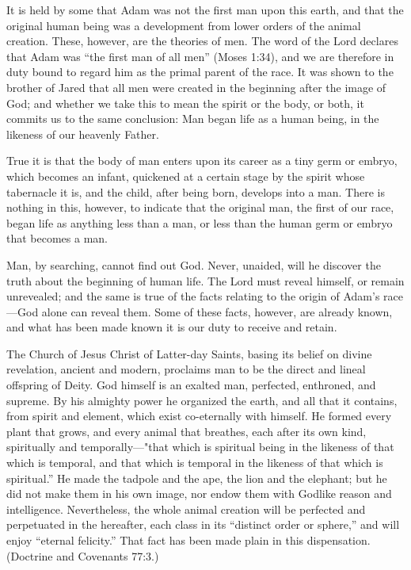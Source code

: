 It is held by some that Adam was not the first man upon this earth, and that the original
human being was a development from lower orders of the animal creation. These, however,
are the theories of men. The word of the Lord declares that Adam was ``the first man of all
men'' (Moses 1:34), and we are therefore in duty bound to regard him as the primal parent of
the race. It was shown to the brother of Jared that all men were created in the beginning after
the image of God; and whether we take this to mean the spirit or the body, or both, it
commits us to the same conclusion: Man began life as a human being, in the likeness of our
heavenly Father.

True it is that the body of man enters upon its career as a tiny germ or embryo, which
becomes an infant, quickened at a certain stage by the spirit whose tabernacle it is, and the
child, after being born, develops into a man. There is nothing in this, however, to indicate
that the original man, the first of our race, began life as anything less than a man, or less than
the human germ or embryo that becomes a man.

Man, by searching, cannot find out God. Never, unaided, will he discover the truth about the
beginning of human life. The Lord must reveal himself, or remain unrevealed; and the same
is true of the facts relating to the origin of Adam's race—God alone can reveal them. Some of
these facts, however, are already known, and what has been made known it is our duty to
receive and retain.

The Church of Jesus Christ of Latter-day Saints, basing its belief on divine revelation,
ancient and modern, proclaims man to be the direct and lineal offspring of Deity. God
himself is an exalted man, perfected, enthroned, and supreme. By his almighty power he
organized the earth, and all that it contains, from spirit and element, which exist co-eternally
with himself. He formed every plant that grows, and every animal that breathes, each after its
own kind, spiritually and temporally—"that which is spiritual being in the likeness of that
which is temporal, and that which is temporal in the likeness of that which is spiritual.'' He
made the tadpole and the ape, the lion and the elephant; but he did not make them in his own
image, nor endow them with Godlike reason and intelligence. Nevertheless, the whole animal
creation will be perfected and perpetuated in the hereafter, each class in its ``distinct order or
sphere,'' and will enjoy ``eternal felicity.'' That fact has been made plain in this dispensation.
(Doctrine and Covenants 77:3.)

